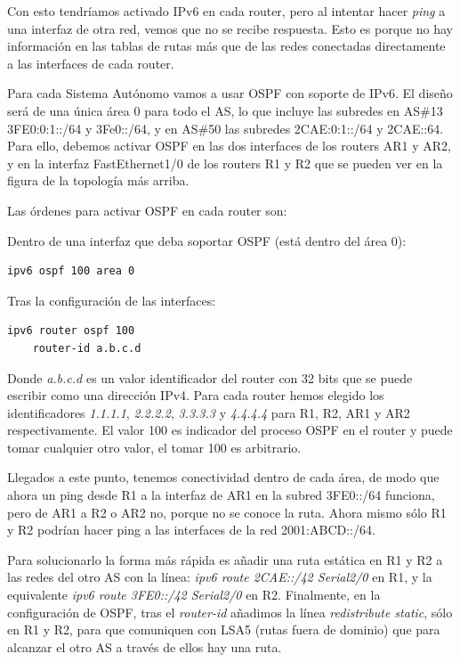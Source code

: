 \documentclass{article}
\begin{document}
Con esto tendríamos activado IPv6 en cada router, pero al intentar hacer \textit{ping} a una interfaz de otra red, vemos que no se recibe respuesta. Esto es porque no hay información en las tablas de rutas más que de las redes conectadas directamente a las interfaces de cada router.

Para cada Sistema Autónomo vamos a usar OSPF con soporte de IPv6. El diseño será de una única área 0 para todo el AS, lo que incluye las subredes en AS\#13 3FE0:0:1::/64 y 3Fe0::/64, y en AS\#50 las subredes 2CAE:0:1::/64 y 2CAE::64. Para ello, debemos activar OSPF en las dos interfaces de los routers AR1 y AR2, y en la interfaz FastEthernet1/0 de los routers R1 y R2 que se pueden ver en la figura de la topología más arriba.

Las órdenes para activar OSPF en cada router son:

Dentro de una interfaz que deba soportar OSPF (está dentro del área 0):
\begin{lstlisting}
ipv6 ospf 100 area 0
\end{lstlisting}

Tras la configuración de las interfaces:
\begin{lstlisting}
ipv6 router ospf 100
	router-id a.b.c.d
\end{lstlisting}

Donde \textit{a.b.c.d} es un valor identificador del router con 32 bits que se puede escribir como una dirección IPv4. Para cada router hemos elegido los identificadores \textit{1.1.1.1}, \textit{2.2.2.2}, \textit{3.3.3.3} y \textit{4.4.4.4} para R1, R2, AR1 y AR2 respectivamente. El valor 100 es indicador del proceso OSPF en el router y puede tomar cualquier otro valor, el tomar 100 es arbitrario.

Llegados a este punto, tenemos conectividad dentro de cada área, de modo que ahora un ping desde R1 a la interfaz de AR1 en la subred 3FE0::/64 funciona, pero de AR1 a R2 o AR2 no, porque no se conoce la ruta. Ahora mismo sólo R1 y R2 podrían hacer ping a las interfaces de la red 2001:ABCD::/64.

Para solucionarlo la forma más rápida es añadir una ruta estática en R1 y R2 a las redes del otro AS con la línea: \textit{ipv6 route 2CAE::/42 Serial2/0} en R1, y la equivalente \textit{ipv6 route 3FE0::/42 Serial2/0} en R2. Finalmente, en la configuración de OSPF, tras el \textit{router-id} añadimos la línea \textit{redistribute static}, sólo en R1 y R2, para que comuniquen con LSA5 (rutas fuera de dominio) que para alcanzar el otro AS a través de ellos hay una ruta.
\\
\end{document}
